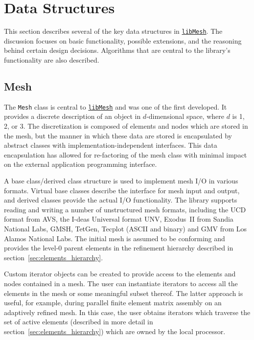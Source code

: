 \documentclass[global,twocolumn,final]{svjour}
\newcommand{\libMesh}{\href{http://libmesh.sourceforge.net}{\texttt{lib\-Mesh}}}
\begin{document}
\section{Data Structures}
This section describes several of the key data structures in
\libMesh{}.  The discussion focuses on basic functionality, possible
extensions, and the reasoning behind certain design decisions.  
Algorithms that are central to the library's functionality are also
described.

\subsection{Mesh\label{sec:mesh}}
The \texttt{Mesh} class is central to \libMesh{} and was one of
the first developed.  It provides a discrete description of an
object in $d$-dimensional space, where $d$ is 1, 2, or 3.  The
discretization is composed of elements and nodes which are stored in
the mesh, but the manner in which these data are stored is encapsulated
by abstract classes with implementation-indepen\-dent
interfaces.  This data encapsulation has allowed for
re-factoring of the mesh class with minimal impact on the external
application programming interface.

A base class/derived class structure is used to implement mesh I/O in
various formats.  Virtual base classes describe the interface for mesh
input and output, and derived classes provide the actual I/O
functionality.  The library supports reading and writing a
number of unstructured mesh formats, including the UCD format from
AVS, the I-deas Universal format UNV, Exodus~II from Sandia National
Labs, GMSH, TetGen, Tecplot (ASCII and binary) and GMV from Los
Alamos National Labs.  The initial mesh is assumed to be conforming
and provides the level-0 parent elements in the refinement hierarchy
described in section~\ref{sec:elements_hierarchy}.

Custom iterator objects can be created to provide access to the
elements and nodes contained in a mesh.  The user can instantiate
iterators to access all the elements in the mesh or some meaningful
subset thereof.  The latter approach is useful, for example, during
parallel finite element matrix assembly on an adaptively refined mesh.
In this case, the user obtains iterators which traverse the set of
active elements (described in more detail in
section~\ref{sec:elements_hierarchy}) which are owned by the local
processor.
\end{document}
